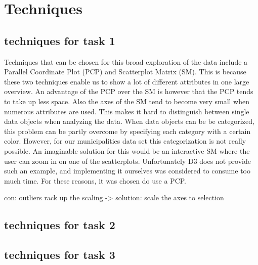 \section{Techniques}

\subsection{techniques for task 1}

Techniques that can be chosen for this broad exploration of the data include a Parallel Coordinate Plot (PCP) and Scatterplot Matrix (SM). This is because these two techniques enable us to show a lot of different attributes in one large overview. An advantage of the PCP over the SM is however that the PCP tends to take up less space. Also the axes of the SM tend to become very small when numerous attributes are used. This makes it hard to distinguish between single data objects when analyzing the data. When data objects can be be categorized, this problem can be partly overcome by specifying each category with a certain color. However, for our municipalities data set this categorization is not really possible. An imaginable solution for this would be an interactive SM where the user can zoom in on one of the scatterplots. Unfortunately D3 \cite{D3} does not provide such an example, and implementing it ourselves was considered to consume too much time. For these reasons, it was chosen do use a PCP.

con: outliers rack up the scaling -> solution: scale the axes to selection


\subsection{techniques for task 2}

\subsection{techniques for task 3}
